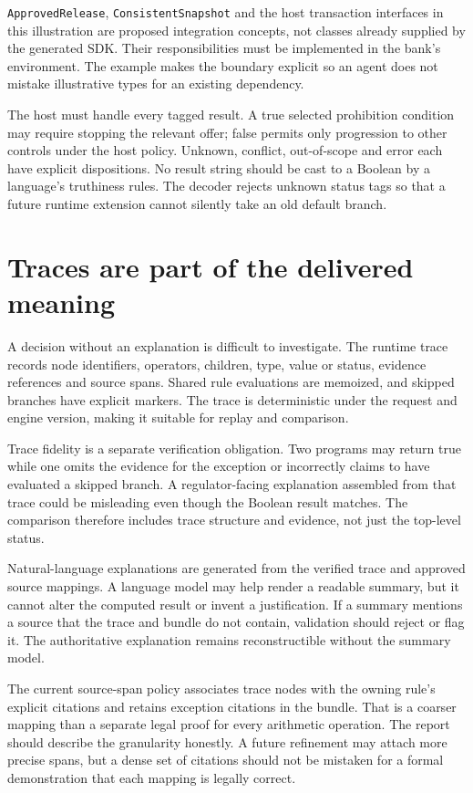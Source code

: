 \texttt{ApprovedRelease}, \texttt{ConsistentSnapshot} and the host transaction
interfaces in this illustration are proposed integration concepts, not classes
already supplied by the generated SDK. Their responsibilities must be implemented
in the bank's environment. The example makes the boundary explicit so an agent
does not mistake illustrative types for an existing dependency.

The host must handle every tagged result. A true selected prohibition condition
may require stopping the relevant offer; false permits only progression to other
controls under the host policy. Unknown, conflict, out-of-scope and error each
have explicit dispositions. No result string should be cast to a Boolean by a
language's truthiness rules. The decoder rejects unknown status tags so that a
future runtime extension cannot silently take an old default branch.

\section{Traces are part of the delivered meaning}

A decision without an explanation is difficult to investigate. The runtime trace
records node identifiers, operators, children, type, value or status, evidence
references and source spans. Shared rule evaluations are memoized, and skipped
branches have explicit markers. The trace is deterministic under the request and
engine version, making it suitable for replay and comparison.

Trace fidelity is a separate verification obligation. Two programs may return
true while one omits the evidence for the exception or incorrectly claims to have
evaluated a skipped branch. A regulator-facing explanation assembled from that
trace could be misleading even though the Boolean result matches. The comparison
therefore includes trace structure and evidence, not just the top-level status.

Natural-language explanations are generated from the verified trace and approved
source mappings. A language model may help render a readable summary, but it
cannot alter the computed result or invent a justification. If a summary mentions
a source that the trace and bundle do not contain, validation should reject or
flag it. The authoritative explanation remains reconstructible without the
summary model.

The current source-span policy associates trace nodes with the owning rule's
explicit citations and retains exception citations in the bundle. That is a
coarser mapping than a separate legal proof for every arithmetic operation. The
report should describe the granularity honestly. A future refinement may attach
more precise spans, but a dense set of citations should not be mistaken for a
formal demonstration that each mapping is legally correct.

